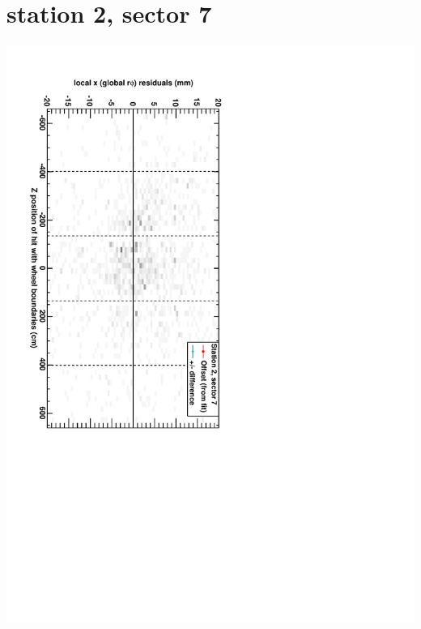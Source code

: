 \documentclass[compress]{beamer}
\begin{document}
\section*{station 2, sector 7}
\begin{frame} \vfill \mbox{\hspace{-1 cm}\includegraphics[height=1.2\linewidth, angle=90]{DTrphiVsZ_st2_sr07.pdf}} \end{frame}
\end{document}
